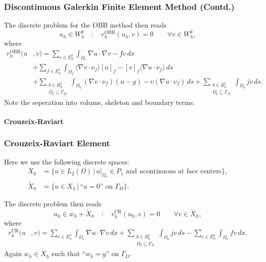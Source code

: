 \begin{frame}
\frametitle<presentation>{Discontinuous Galerkin Finite Element
Method (Contd.)}
The discrete problem for the OBB method \cite{OBB98} then reads
\begin{equation*}
u_h \in W^k_h \quad : \quad r_h^\text{OBB}(u_h,v) = 0 \qquad \forall v\in W_h^k,
\end{equation*}
where
\begin{equation*}
\begin{split}
r_h^\text{OBB}(u &,v) = \sum_{e\in E_h^0} \int_{\Omega_e} \nabla u\cdot \nabla v
 - fv \, dx \\
&+ \sum_{f\in E^1_h} \int_{\Omega_f} \langle \nabla v\cdot\nu_f\rangle [u]_f
- [v]_f \langle \nabla u\cdot \nu_f\rangle \, ds\\
&+ \sum_{\substack{b\in B^1_h\\\Omega_b\subseteq\Gamma_D}} \int_{\Omega_b} (\nabla v\cdot\nu_f) (u-g)
- v (\nabla u\cdot \nu_f) \, ds + \sum_{\substack{b\in
B^1_h\\\Omega_b\subseteq\Gamma_N}} \int_{\Omega_b} j v \,ds .
\end{split}
\end{equation*}
Note the seperation into volume, skeleton and boundary terms.
\end{frame}


\paragraph{Crouzeix-Raviart}

\begin{frame}
\frametitle<presentation>{Crouzeix-Raviart Element}
Here we use the following discrete spaces:
\begin{align*}
X_h &= \{u\in L_2(\Omega) \,|\, u|_{\Omega_e}\in P_1 \text{ and $u$
continuous at face centers}\},\\
\tilde{X}_h &= \{u\in X_h \,|\, \text{``$u=0$'' on $\Gamma_D$}\}.
\end{align*}

The discrete problem then reads
\begin{equation*}
u_h \in w_h+\tilde{X}_h \quad : \quad r_h^\text{CR}(u_h,v) = 0 \qquad \forall v\in \tilde{X}_h,
\end{equation*}
where
\begin{equation*}
\begin{split}
r_h^\text{CR}(u &,v) = \sum_{e\in E_h^0} \int_{\Omega_e} \nabla u\cdot \nabla v \, dx
+ \sum_{\substack{b\in
B^1_h\\\Omega_b\subseteq\Gamma_N}} \int_{\Omega_b} j v \,ds  - \sum_{e\in E_h^0} \int_{\Omega_e} fv \, dx .
\end{split}
\end{equation*}
Again $w_h\in X_h$ such that ``$w_h=g$'' on $\Gamma_D$.
\end{frame}

